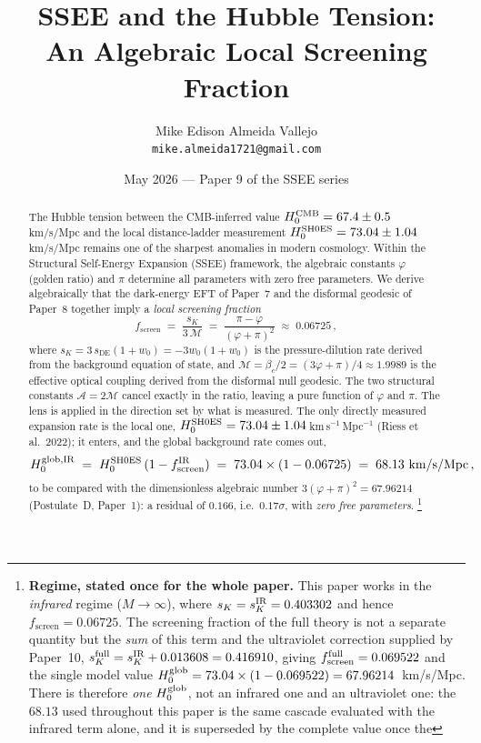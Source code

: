 \documentclass[12pt,a4paper]{article}
\title{\textbf{SSEE and the Hubble Tension:\\
       An Algebraic Local Screening Fraction}}
\author{Mike Edison Almeida Vallejo\\
        \small\texttt{mike.almeida1721@gmail.com}}
\date{May 2026 --- Paper 9 of the SSEE series}
\newcommand{\phiG}{\varphi}
\newcommand{\MIRA}{\mathcal{M}}
\newcommand{\AURA}{\mathcal{A}}
\newcommand{\bc}{\beta_c}
\newcommand{\fsc}{f_{\mathrm{screen}}}
\newcommand{\sK}{s_K}          %
\newcommand{\sDE}{s_{\mathrm{DE}}} %
\begin{document}
\maketitle

\begin{abstract}
The Hubble tension between the CMB-inferred value $H_0^{\rm CMB} = 67.4\pm0.5$
km/s/Mpc and the local distance-ladder measurement $H_0^{\rm SH0ES} = 73.04\pm1.04$
km/s/Mpc remains one of the sharpest anomalies in modern cosmology.
Within the Structural Self-Energy Expansion (SSEE) framework, the algebraic
constants $\phiG$ (golden ratio) and $\pi$ determine all parameters with zero
free parameters.
We derive algebraically that the dark-energy EFT of Paper~7 and the disformal
geodesic of Paper~8 together imply a \emph{local screening fraction}
\[
  \fsc \;=\; \frac{\sK}{3\,\MIRA}
       \;=\; \frac{\pi - \phiG}{(\phiG+\pi)^2}
       \;\approx\; 0.06725\,,
\]
where $\sK = 3\,\sDE(1+w_0) = -3w_0(1+w_0)$ is the pressure-dilution rate
derived from the
background equation of state, and $\MIRA = \bc/2 = (3\phiG+\pi)/4 \approx 1.9989$
is the effective optical coupling derived from the disformal null geodesic.
The two structural constants $\AURA = 2\MIRA$ cancel exactly in the ratio,
leaving a pure function of $\phiG$ and $\pi$.
The lens is applied in the direction set by what is measured. The only
directly measured expansion rate is the local one,
$H_0^{\rm SH0ES} = 73.04\pm1.04$\,km\,s$^{-1}$\,Mpc$^{-1}$
(Riess et al.\ 2022); it enters, and the global background rate comes out,
\[
  H_0^{\rm glob,IR} \;=\; H_0^{\rm SH0ES}\,(1-\fsc^{\rm IR})
                 \;=\; 73.04\times(1-0.06725)
                 \;=\; 68.13 \text{ km/s/Mpc}\,,
\]
to be compared with the dimensionless algebraic number
$3(\phiG+\pi)^2 = 67.96214$ (Postulate~D, Paper~1): a residual of $0.166$,
i.e.\ $0.17\sigma$, with \emph{zero free parameters}.
\footnote{\label{fn:regime}\textbf{Regime, stated once for the whole paper.} This paper works
in the \emph{infrared} regime ($M\to\infty$), where $\sK=\sK^{\rm IR}=0.403302$
and hence $\fsc=0.06725$.  The screening fraction of the full theory is not a
separate quantity but the \emph{sum} of this term and the ultraviolet
correction supplied by Paper~10, $\sK^{\rm full}=\sK^{\rm IR}+0.013608=0.416910$,
giving $\fsc^{\rm full}=0.069522$ and the single model value
$H_0^{\rm glob}=73.04\times(1-0.069522)=67.96214$~km/s/Mpc.  There is
therefore \emph{one} $H_0^{\rm glob}$, not an infrared one and an ultraviolet
one: the $68.13$ used throughout this paper is the same cascade evaluated with
the infrared term alone, and it is superseded by the complete value once the
}
\end{abstract}
\end{document}
